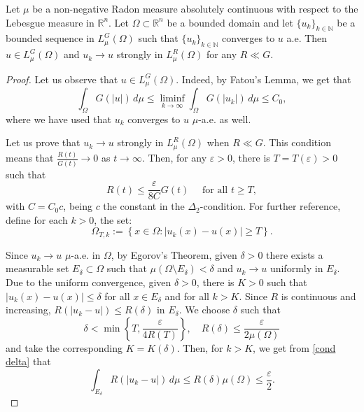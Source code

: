 \documentclass[10pt,a4paper]{amsart}
\newcommand{\N}{\mathbb{N}}
\newcommand{\R}{\mathbb{R}}
\begin{document}
\begin{lemma} \label{lemma.1}Let $\mu$ be a non-negative Radon measure absolutely continuous with respect to the Lebesgue measure in $\mathbb{R}^n$.
 Let $\Omega\subset \R^n$ be a bounded domain and let $\{u_k\}_{k \in \N}$ be a bounded sequence in $L_{\mu}^G(\Omega)$ such that $\{u_k\}_{k\in\N}$ converges to $u$ a.e. Then $u\in L_\mu^G(\Omega)$ and $u_k\to u$ strongly in $L_{\mu}^R(\Omega)$ for any $R\ll G$.
\end{lemma}

\begin{proof}
Let us observe that $u\in L_{\mu}^G(\Omega)$. Indeed, by Fatou's Lemma, we get that
$$
\int_\Omega G(|u|)\,d\mu \leq \liminf_{k\to\infty} \int_\Omega G(|u_k|)\,d\mu \leq C_0,
$$where we have used that $u_k$ converges to $u$ $\mu$-a.e. as well.

 
Let us prove that $u_k\to u$ strongly in $L_{\mu}^R(\Omega)$ when $R\ll G$. This condition means that 
$\frac{R(t)}{G(t)}\to 0$ as  $t\to\infty$. Then, for any $\varepsilon>0$, there is $T=T(\varepsilon)>0$ such that
\begin{equation}\label{R and G}
R(t)\leq \frac{\varepsilon}{8C} G(t) \quad \text{ for all } t \geq T,
\end{equation} 
with $C=C_0 c$, being $c$ the constant in the  $\Delta_2$-condition. For further reference, define for each $k>0$, the set:
$$\Omega_{T, k}:=\left\lbrace x\in \Omega: |u_k(x)-u(x)|\geq T \right\rbrace.$$

 Since $u_k\to u$ $\mu$-a.e. in $\Omega$, by Egorov's Theorem, given $\delta>0$ there exists a measurable set $E_\delta \subset \Omega$ such that $\mu(\Omega\setminus E_\delta)<\delta$ and $u_k\to u$ uniformly in $E_\delta$. Due to the uniform convergence, given $\delta>0$, there is $K>0$ such that $|u_k(x)-u(x)|\leq \delta$ for all $x\in E_\delta$ and for all $k>K$. Since $R$ is continuous and increasing, $R(|u_k-u|)\leq R(\delta)$ in $E_{\delta}$. We choose $\delta$ such that 
\begin{equation}\label{cond delta}
\delta<\min\left\lbrace T,\dfrac{ \varepsilon}{4R(T)}\right\rbrace, \quad R(\delta)\leq \frac{\varepsilon}{2\mu(\Omega)}
\end{equation}and take the corresponding $K=K(\delta)$. Then, for $k> K$, we get from \eqref{cond delta} that
$$
\int_{E_{\delta}} R(|u_k-u|)\,d\mu \leq R(\delta)\mu(\Omega)\leq \frac{\varepsilon}{2}.
$$


\end{proof}
\end{document}
